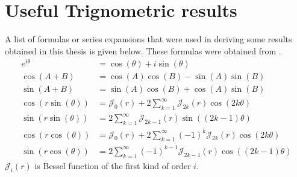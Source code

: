 %

\chapter{Useful Trignometric results} \label{app:trig}
A list of formulas or series expansions that were used in deriving some results obtained in this thesis is given below.
These formulas were obtained from \parencite{abramowitz2012handbook}.
\begin{align}
  e^{i\theta} &= \cos(\theta) + i\sin(\theta) \\
  \cos(A + B) &= \cos(A) \cos(B) - \sin(A)\sin(B) \\
  \sin(A + B) &= \sin(A) \cos(B) + \cos(A)\sin(B) \\
  \cos(r\sin(\theta)) &= \mathcal{J}_{0}(r) + 2\sum_{k=1}^{\infty}\mathcal{J}_{2k}(r) \cos(2k\theta) \\
  \sin(r\sin(\theta)) &= 2\sum_{k=1}^{\infty}\mathcal{J}_{2k-1}(r) \sin((2k-1)\theta) \\
  \cos(r\cos(\theta)) &= \mathcal{J}_{0}(r) + 2\sum_{k=1}^{\infty}(-1)^{k}\mathcal{J}_{2k}(r) \cos(2k\theta) \\
  \sin(r\cos(\theta)) &= 2\sum_{k=1}^{\infty}(-1)^{k-1}\mathcal{J}_{2k-1}(r) \cos((2k-1)\theta)
\end{align}
$\mathcal{J}_{i}(r)$ is Bessel function of the first kind of order $i$.
% 
